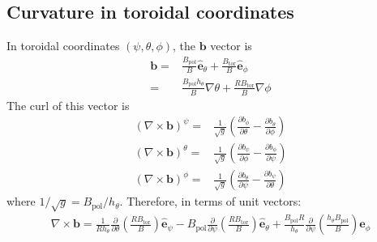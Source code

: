 \documentclass[12pt]{article}
\newcommand{\deriv}[2]{\ensuremath{\frac{\partial #1}{\partial #2}}}
\newcommand{\hthe}{\ensuremath{h_\theta}}
\newcommand{\Bp}{\ensuremath{B_{\text{pol}}}}
\newcommand{\Bt}{\ensuremath{B_{\text{tor}}}}
\newcommand{\ve}[1]{\ensuremath{\boldsymbol{#1}}}
\newcommand{\hv}[1]{\hat{\ve{#1}}}
\newcommand{\bvec}{\ve{b}}
\newcommand{\ehat}{\ensuremath{\hv{e}}}
\begin{document}
\subsection{Curvature in toroidal coordinates}
In toroidal coordinates $\left(\psi,\theta,\phi\right)$, the $\bvec$ vector
is
%
\begin{align*}
\bvec =& \frac{\Bp}{B}\ehat_\theta + \frac{\Bt}{B}\ehat_\phi \\
=& \frac{\Bp\hthe}{B}\nabla\theta + \frac{R\Bt}{B}\nabla\phi
\end{align*}
%
The curl of this vector is
%
\begin{align*}
\left(\nabla\times\bvec\right)^\psi =&
\frac{1}{\sqrt{g}}\left(\deriv{b_\phi}{\theta} - \deriv{b_\theta}{\phi}\right)
\\
\left(\nabla\times\bvec\right)^\theta =&
\frac{1}{\sqrt{g}}\left(\deriv{b_\psi}{\phi} - \deriv{b_\phi}{\psi}\right) \\
\left(\nabla\times\bvec\right)^\phi =&
\frac{1}{\sqrt{g}}\left(\deriv{b_\theta}{\psi} - \deriv{b_\psi}{\theta}\right)
\end{align*}
%
where $1/\sqrt{g} = \Bp/\hthe$. Therefore, in terms of unit vectors:
%
\begin{align*}
\nabla\times\bvec =
\frac{1}{R\hthe}\deriv{}{\theta}\left(\frac{R\Bt}{B}\right)\ehat_\psi -
\Bp\deriv{}{\psi}\left(\frac{R\Bt}{B}\right)\ehat_\theta + \frac{\Bp
R}{\hthe}\deriv{}{\psi}\left(\frac{\hthe\Bp}{B}\right)\ehat_\phi
\end{align*}
\end{document}

